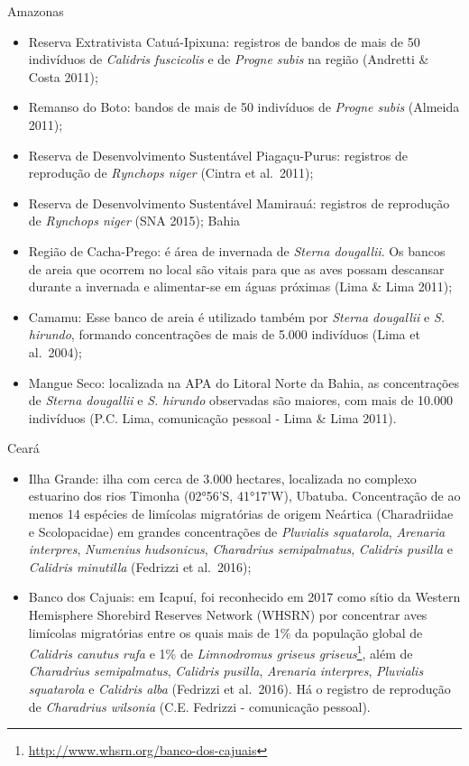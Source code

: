 \documentclass[
  oneside]{scrbook}
\DeclareRobustCommand{\href}[2]{#2\footnote{\url{#1}}}
\begin{document}
Amazonas

\begin{itemize}
\item
  Reserva Extrativista Catuá-Ipixuna: registros de bandos de mais de 50 indivíduos de \emph{Calidris fuscicolis} e de \emph{Progne subis} na região (Andretti \& Costa 2011);
\item
  Remanso do Boto: bandos de mais de 50 indivíduos de \emph{Progne subis} (Almeida 2011);
\item
  Reserva de Desenvolvimento Sustentável Piagaçu-Purus: registros de reprodução de \emph{Rynchops niger} (Cintra et al.~2011);
\item
  Reserva de Desenvolvimento Sustentável Mamirauá: registros de reprodução de \emph{Rynchops niger} (SNA 2015);
  Bahia
\item
  Região de Cacha-Prego: é área de invernada de \emph{Sterna dougallii}. Os bancos de areia que ocorrem no local são vitais para que as aves possam descansar durante a invernada e alimentar-se em águas próximas (Lima \& Lima 2011);
\item
  Camamu: Esse banco de areia é utilizado também por \emph{Sterna dougallii} e \emph{S. hirundo}, formando concentrações de mais de 5.000 indivíduos (Lima et al.~2004);
\item
  Mangue Seco: localizada na APA do Litoral Norte da Bahia, as concentrações de \emph{Sterna dougallii} e \emph{S. hirundo} observadas são maiores, com mais de 10.000 indivíduos (P.C. Lima, comunicação pessoal - Lima \& Lima 2011).
\end{itemize}

Ceará

\begin{itemize}
\item
  Ilha Grande: ilha com cerca de 3.000 hectares, localizada no complexo estuarino dos rios Timonha (02°56'S, 41°17'W), Ubatuba. Concentração de ao menos 14 espécies de limícolas migratórias de origem Neártica (Charadriidae e Scolopacidae) em grandes concentrações de \emph{Pluvialis squatarola}, \emph{Arenaria interpres}, \emph{Numenius hudsonicus}, \emph{Charadrius semipalmatus}, \emph{Calidris pusilla} e \emph{Calidris minutilla} (Fedrizzi et al.~2016);
\item
  Banco dos Cajuais: em Icapuí, foi reconhecido em 2017 como sítio da Western Hemisphere Shorebird Reserves Network (WHSRN) por concentrar aves limícolas migratórias entre os quais mais de 1\% da população global de \emph{Calidris canutus rufa} e 1\% de \href{http://www.whsrn.org/banco-dos-cajuais}{\emph{Limnodromus griseus griseus}}, além de \emph{Charadrius semipalmatus}, \emph{Calidris pusilla}, \emph{Arenaria interpres}, \emph{Pluvialis squatarola} e \emph{Calidris alba} (Fedrizzi et al.~2016). Há o registro de reprodução de \emph{Charadrius wilsonia} (C.E. Fedrizzi - comunicação pessoal).
\end{itemize}
\end{document}
